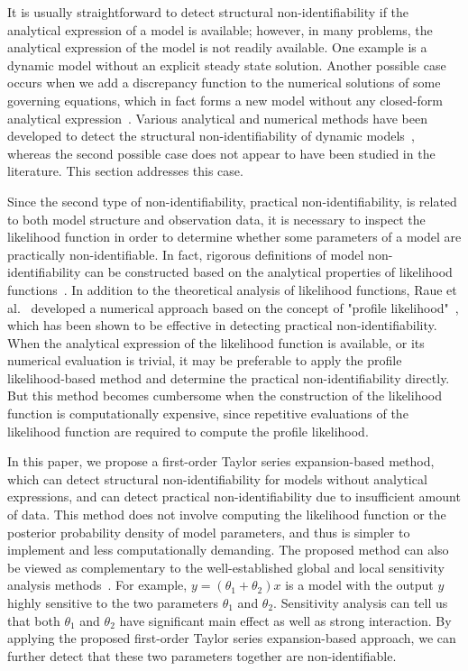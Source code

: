 \documentclass[preprint,review,12pt,3p]{elsarticle}
\begin{document}
It is usually straightforward to detect structural non-identifiability if the analytical expression of a model is available; however, in many problems, the analytical expression of the model is not readily available. One example is a dynamic model without an explicit steady state solution. Another possible case occurs when we add a discrepancy function to the numerical solutions of some governing equations, which in fact forms a new model without any closed-form analytical expression~\citep{Arendt2012}. Various analytical and numerical methods have been developed to detect the structural non-identifiability of dynamic models~\citep{Grewal1976,Walter1996,Jia-fan2011}, whereas the second possible case does not appear to have been studied in the literature. This section addresses this case. 

Since the second type of non-identifiability, practical non-identifiability, is related to both model structure and observation data, it is necessary to inspect the likelihood function in order to determine whether some parameters of a model are practically non-identifiable.  In fact, rigorous definitions of model non-identifiability can be constructed based on the analytical properties of likelihood functions~\citep{Gu1994,Paulino1994,Little2010}. In addition to the theoretical analysis of likelihood functions, Raue et al.~\citep{Raue2009,Raue2011} developed a numerical approach based on the concept of "profile likelihood"~\citep{Murphy2000}, which has been shown to be effective in detecting practical non-identifiability. When the analytical expression of the likelihood function is available, or its numerical evaluation is trivial, it may be preferable to apply the profile likelihood-based method and determine the practical non-identifiability directly. But this method becomes cumbersome when the construction of the likelihood function is computationally expensive, since repetitive evaluations of the likelihood function are required to compute the profile likelihood.

In this paper, we propose a first-order Taylor series expansion-based method, which can detect structural non-identifiability for models without analytical expressions, and can detect practical non-identifiability due to insufficient amount of data. This method does not involve computing the likelihood function or the posterior probability density of model parameters, and thus is simpler to implement and less computationally demanding. The proposed method can also be viewed as complementary to the well-established global and local sensitivity analysis methods~\citep{Oakley2004,Saltelli2008}. For example, $y= (\theta_1+\theta_2) x$ is a model with the output $y$ highly sensitive to the two parameters $\theta_1$ and $\theta_2$. Sensitivity analysis can tell us that both $\theta_1$ and $\theta_2$ have significant main effect as well as strong interaction. By applying the proposed first-order Taylor series expansion-based approach, we can further detect that these two parameters together are non-identifiable.
\end{document}

